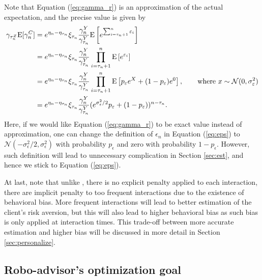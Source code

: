 Note that Equation (\ref{eq:gamma_r}) is an approximation of the actual expectation, and the precise value is given by \begin{equation}\label{eq:gamma_r_acc}
\begin{aligned}
        \gamma_{\tau_n^Z}\mathrm{E}[\gamma_n^C]&=e^{\eta_n-\eta_{\tau_n}}\xi_{\tau_n}\frac{\gamma_n^{Y}}{\gamma_{\tau_n}^{Y}}\mathrm{E}\left[e^{\sum_{i=\tau_n+1}^n\varepsilon_i}\right]\\
        &=e^{\eta_n-\eta_{\tau_n}}\xi_{\tau_n}\frac{\gamma_n^{Y}}{\gamma_{\tau_n}^{Y}}\prod_{i=\tau_n+1}^n \mathrm{E}\left[e^{\varepsilon_i}\right]\\
        &=e^{\eta_n-\eta_{\tau_n}}\xi_{\tau_n}\frac{\gamma_n^{Y}}{\gamma_{\tau_n}^{Y}}\prod_{i=\tau_n+1}^n \mathrm{E}\left[p_\varepsilon e^{X}+(1-p_\varepsilon)e^0\right],\qquad\text{where }x\sim\mathcal{N}(0,\sigma_\varepsilon^2)\\
        &=e^{\eta_n-\eta_{\tau_n}}\xi_{\tau_n}\frac{\gamma_n^{Y}}{\gamma_{\tau_n}^{Y}}(e^{\sigma^2_\varepsilon/2}p_\varepsilon + (1-p_\varepsilon))^{n-\tau_n}.
\end{aligned}
\end{equation} Here, if we would like Equation (\ref{eq:gamma_r}) to be exact value instead of approximation, one can change the definition of $\epsilon_n$ in Equation (\ref{eq:eps}) to $\mathcal{N}(-\sigma^2_\epsilon/2,\sigma_\epsilon^2)$ with probability $p_\epsilon$ and zero with probability $1-p_\epsilon$. However, such definition will lead to unnecessary complication in Section \ref{sec:est}, and hence we stick to Equation (\ref{eq:eps}).

At last, note that unlike , there is no explicit penalty applied to each interaction, there are implicit penalty to too frequent interactions due to the existence of behavioral bias. More frequent interactions will lead to better estimation of the client's risk aversion, but this will also lead to higher behavioral bias as such bias is only applied at interaction times. This trade-off between more accurate estimation and higher bias will be discussed in more detail in Section \ref{sec:personalize}.


\subsection{Robo-advisor's optimization goal}

